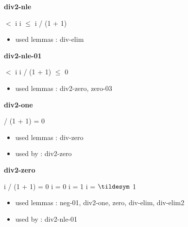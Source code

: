 \documentclass[a4paper]{article}
\begin{document}
\medskip

\bigskip

{\large\bf div2-nle}

\medskip

  $<$ i \Imp \Not i $\le$ i / (1 + 1)

\begin{itemize}


\item       used lemmas  : div-elim

\end{itemize}

\medskip

\bigskip

{\large\bf div2-nle-01}

\medskip

  $<$ i \Imp \Not i / (1 + 1) $\le$ 0

\begin{itemize}


\item       used lemmas  : div2-zero, zero-03

\end{itemize}

\medskip

\bigskip

{\large\bf div2-one}

\medskip

  / (1 + 1) = 0

\begin{itemize}


\item       used lemmas  : div-zero
\item       used by      : div2-zero

\end{itemize}

\medskip

\bigskip

{\large\bf div2-zero}

\medskip

 \Fol i / (1 + 1) = 0 \Equiv i = 0 \Or i = 1 \Or i = $\tildesym$ 1

\begin{itemize}


\item       used lemmas  : neg-01, div2-one, zero, div-elim, div-elim2
\item       used by      : div2-nle-01

\end{itemize}
\end{document}
